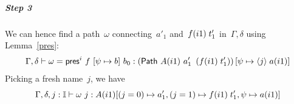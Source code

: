 \subparagraph*{Step 3} We can hence find a path~$\omega$
connecting~$a'_1$ and~$f{}(i1) \; t'_1$ in~$\Gamma,\delta$
using Lemma~\ref{pres}:
%
\[
\Gamma,\delta \vdash \omega = {\sf pres}^{i}~f{}~[\psi\mapsto b]~b_0 :
\left({\sf Path}~A(i1)~a_1'~\left(f{}(i1) \;
    t'_1\right)\right)[\psi\mapsto{\langle}j{\rangle} \; a(i1)]
\]
%
Picking a fresh name~$j$, we have
%
\begin{equation}
  \Gamma,\delta,j:\mathbb{I}\vdash \omega~j : A(i1)[(j=0)\mapsto
  a'_1,(j=1)\mapsto f{}(i1) \; t'_1,\psi\mapsto a(i1)]\label{eq:glue-omega}
\end{equation}


